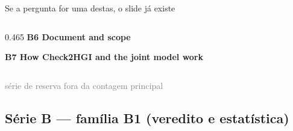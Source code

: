 \documentclass{beamer}
\begin{document}
\begin{frame}[noframenumbering]{Se a pergunta for uma destas, o slide já existe}
\begin{columns}[T,onlytextwidth]
\begin{column}{0.465\textwidth}
        \textbf{B6 \textbullet{} Document and scope}\\
        \hyperlink{b61}{}\hyperlink{b62}{}\hyperlink{b63}{}\hyperlink{b64}{}\hyperlink{b65}{}\hyperlink{b66}{}
        \smallskip

        \textbf{B7 \textbullet{} How Check2HGI and the joint model work}\\
        \hyperlink{b71}{}\hyperlink{b72}{}\hyperlink{b73}{}\hyperlink{b74}{}\hyperlink{b75}{}\hyperlink{b76}{}
    \end{column}
    \end{columns}

    \vfill
    {\scriptsize\textcolor{gray}{série de reserva \textbullet{} fora da contagem principal}}
\end{frame}

\subsection{Série B --- família B1 (veredito e estatística)}
\end{document}
